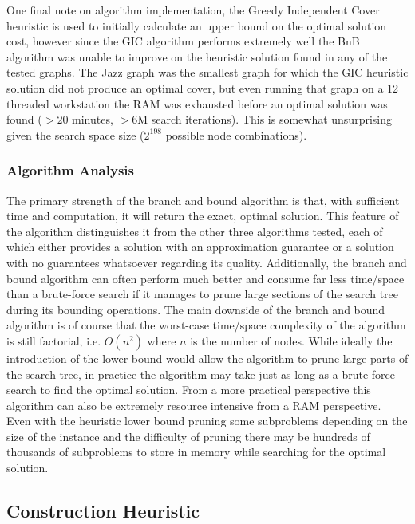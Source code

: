 \documentclass[acmlarge]{acmart}
\begin{document}
One final note on algorithm implementation, the Greedy Independent Cover heuristic is used to initially calculate an upper bound on the optimal solution cost, however since the GIC algorithm performs extremely well the BnB algorithm was unable to improve on the heuristic solution found in any of the tested graphs. The Jazz graph was the smallest graph for which the GIC heuristic solution did not produce an optimal cover, but even running that graph on a 12 threaded workstation the RAM was exhausted before an optimal solution was found ($>20$ minutes, $>6$M search iterations). This is somewhat unsurprising given the search space size ($2^{198}$ possible node combinations).
\subsubsection{Algorithm Analysis}
The primary strength of the branch and bound algorithm is that, with sufficient time and computation, it will return the exact, optimal solution. This feature of the algorithm distinguishes it from the other three algorithms tested, each of which either provides a solution with an approximation guarantee or a solution with no guarantees whatsoever regarding its quality. Additionally, the branch and bound algorithm can often perform much better and consume far less time/space than a brute-force search if it manages to prune large sections of the search tree during its bounding operations.
The main downside of the branch and bound algorithm is of course that the worst-case time/space complexity of the algorithm is still factorial, i.e. $O(n^2)$ where $n$ is the number of nodes. While ideally the introduction of the lower bound would allow the algorithm to prune large parts of the search tree, in practice the algorithm may take just as long as a brute-force search to find the optimal solution.
From a more practical perspective this algorithm can also be extremely resource intensive from a RAM perspective. Even with the heuristic lower bound pruning some subproblems depending on the size of the instance and the difficulty of pruning there may be hundreds of thousands of subproblems to store in memory while searching for the optimal solution.

\subsection{Construction Heuristic}
\end{document}
